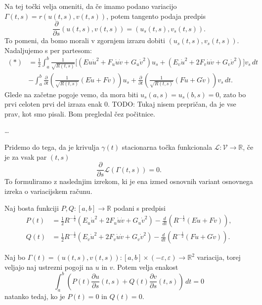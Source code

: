 Na tej točki velja omeniti, da če imamo podano variacijo $\Gamma(t,s) = r(u(t,s), v(t,s))$, potem tangento podaja predpis \begin{equation*}
\frac{ \partial  }{ \partial s } (u(t,s), v(t,s)) = (u_s(t,s), v_s(t,s)).
\end{equation*}  
To pomeni, da bomo morali v zgornjem izrazu dobiti $(u_s(t,s), v_s(t,s))$. Nadaljujemo s per partesom: \begin{align*}
    (*) &= \frac{1}{2} \int_{a}^{b}  \frac{1}{\sqrt{R(t,s)}} \bigg[ (Eu \dot{u}^2 + F_u \dot{u} \dot{v} + G_u \dot{v}^2) u_s + (E_v \dot{u}^2 + 2F_v \dot{u} \dot{v} + G_v \dot{v}^2) \bigg]v_s \, dt \\
    &- \int_{a}^{b} \frac{ \partial  }{ \partial t } \left( \frac{1}{\sqrt{R(t,s)}} (E\dot{u} + F\dot{v}) \right) u_s  + \frac{ \partial  }{ \partial t } \left( \frac{1}{\sqrt{R(t,s)}} (F\dot{u} + G\dot{v}) \right) v_s \, dt.
\end{align*}
Glede na začetne pogoje vemo, da mora biti $u_s(a,s) = u_s(b,s) = 0$, zato bo prvi celoten prvi del izraza enak 0.
TODO: Tukaj nisem prepričan, da je vse prav, kot smo pisali. Bom pregledal čez počitnice.

\ldots

Pridemo do tega, da je krivulja $\gamma(t)$ stacionarna točka funkcionala $\mathcal{L}: \mathcal{V} \to  \mathbb{R}$, če je za vsak par $(t,s)$\begin{equation*}
\frac{ \partial  }{ \partial s } \mathcal{L}(\Gamma(t,s)) = 0.  
\end{equation*}  
To formuliramo z naslednjim izrekom, ki je ena izmed osnovnih variant osnovnega izreka o variacijskem računu.

\begin{izrek}
\label{izr_osnovni_izrek_o_variacijskem_racunu}
Naj bosta funkciji $P, Q: [a,b] \to  \mathbb{R}$ podani s predpisi \begin{align*}
    P(t) &= \frac{1}{2} R^{-\frac{1}{2}} (E_u \dot{u}^2 + 2F_u \dot{u} \dot{v} + G_u \dot{v}^2) - \frac{d}{dt} (R^{-\frac{1}{2}}(E\dot{u} + F\dot{v})), \\
    Q(t) &= \frac{1}{2} R^{-\frac{1}{2}} (E_v \dot{u}^2 + 2F_v \dot{u} \dot{v} + G_v \dot{v}^2) - \frac{d}{dt} (R^{-\frac{1}{2}}(F\dot{u} + G\dot{v})).
\end{align*}

Naj bo $\Gamma(t) = (u(t,s), v(t,s)) : [a,b] \times (-\varepsilon, \varepsilon) \to \mathbb{R}^2$ variacija, torej veljajo naj ustrezni pogoji na $u$ in $v$. Potem velja enakost \begin{equation*}
 \int_{a}^{b}  \left( P(t) \frac{ \partial u }{ \partial s }(t, s)  + Q(t) \frac{ \partial v }{ \partial s }(t, s) \right)  \, dt = 0 
 \end{equation*}  
natanko tedaj, ko je $P(t) = 0$ in $Q(t) = 0$.
\end{izrek}

